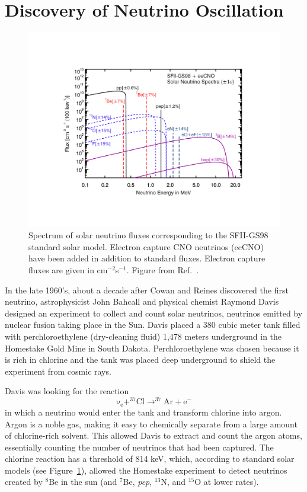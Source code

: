 \section{Discovery of Neutrino Oscillation} \label{sec:NeutrinoOsc}

\begin{figure}[h]
	\centering
	\includegraphics[width=0.7\linewidth]{tex/2-neutrinos-images/SolarFlux}
	\caption[Spectrum of solar neutrino fluxes]{Spectrum of solar neutrino fluxes corresponding to the SFII-GS98 standard solar model. Electron capture CNO neutrinos (ecCNO) have been added in addition to standard fluxes. Electron capture fluxes are given in cm$^{-2}$s$^{-1}$. Figure from Ref.~\cite{Serenelli:2016dgz}.}
	\label{fig:solarflux}
\end{figure}

In the late 1960's, about a decade after Cowan and Reines discovered the first neutrino, astrophysicist John Bahcall and physical chemist Raymond Davis designed an experiment to collect and count solar neutrinos, neutrinos emitted by nuclear fusion taking place in the Sun. 
Davis placed a 380 cubic meter tank filled with perchloroethylene (dry-cleaning fluid) 1,478 meters underground in the Homestake Gold Mine in South Dakota. 
Perchloroethylene was chosen because it is rich in chlorine and the tank was placed deep underground to shield the experiment from cosmic rays. 

Davis was looking for the reaction 
\begin{equation}
	\mathrm{\nu _{e}+ ^{37}Cl \rightarrow  ^{37}Ar+e^{-}} 
	\label{eq:ClAr}
\end{equation}
in which a neutrino would enter the tank and transform chlorine into argon. 
Argon is a noble gas, making it easy to chemically separate from a large amount of chlorine-rich solvent.
This allowed Davis to extract and count the argon atoms, essentially counting the number of neutrinos that had been captured.
The chlorine reaction has a threshold of 814 keV, which, according to standard solar models (see Figure~\ref{fig:solarflux}), allowed the Homestake experiment to detect neutrinos created by $^8$Be in the sun (and $^7$Be, \textit{pep}, $^{13}$N, and $^{15}$O at lower rates).


